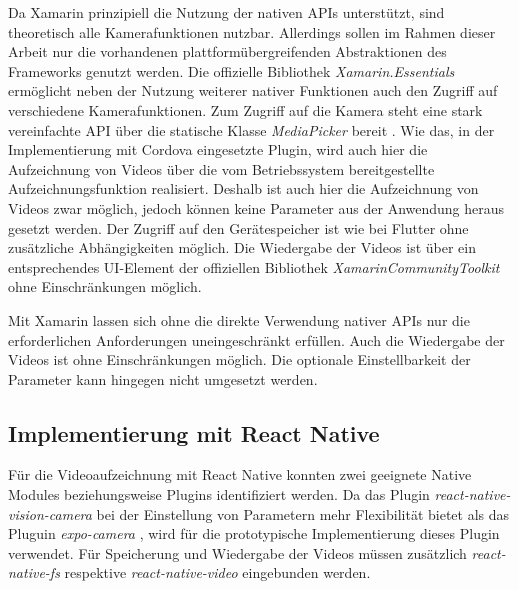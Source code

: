 Da Xamarin prinzipiell die Nutzung der nativen \acp{API} unterstützt, sind theoretisch alle Kamerafunktionen nutzbar.
Allerdings sollen im Rahmen dieser Arbeit nur die vorhandenen plattformübergreifenden Abstraktionen des Frameworks genutzt werden.
Die offizielle Bibliothek \textit{Xamarin.Essentials} ermöglicht neben der Nutzung weiterer nativer Funktionen auch den Zugriff auf verschiedene Kamerafunktionen.
Zum Zugriff auf die Kamera steht eine stark vereinfachte \ac{API} über die statische Klasse \textit{MediaPicker} bereit \cite{Xamarin_MediaPicker}.
Wie das, in der Implementierung mit Cordova eingesetzte Plugin, wird auch hier die Aufzeichnung von Videos über die vom Betriebssystem bereitgestellte Aufzeichnungsfunktion realisiert.
Deshalb ist auch hier die Aufzeichnung von Videos zwar möglich, jedoch können keine Parameter aus der Anwendung heraus gesetzt werden.
Der Zugriff auf den Gerätespeicher ist wie bei Flutter ohne zusätzliche Abhängigkeiten möglich.
Die Wiedergabe der Videos ist über ein entsprechendes \ac{UI}-Element der offiziellen Bibliothek \textit{XamarinCommunityToolkit} \cite{Xamarin_CommunityToolkit} ohne Einschränkungen möglich.

Mit Xamarin lassen sich ohne die direkte Verwendung nativer \acp{API} nur die erforderlichen Anforderungen uneingeschränkt erfüllen.
Auch die Wiedergabe der Videos ist ohne Einschränkungen möglich.
Die optionale Einstellbarkeit der Parameter kann hingegen nicht umgesetzt werden.


\subsection{Implementierung mit React Native}
\label{sec:evaluation_reactnative}
Für die Videoaufzeichnung mit React Native konnten zwei geeignete Native Modules beziehungsweise Plugins identifiziert werden.
Da das Plugin \textit{react-native-vision-camera} \cite{Vision_Canmera} bei der Einstellung von Parametern mehr Flexibilität bietet als das Pluguin \textit{expo-camera} \cite{Expo_Camera}, wird für die prototypische Implementierung dieses Plugin verwendet.
Für Speicherung und Wiedergabe der Videos müssen zusätzlich \textit{react-native-fs} \cite{ReactNative_FileSystem} respektive \textit{react-native-video} \cite{ReactNative_Video} eingebunden werden.

